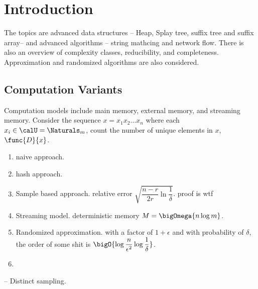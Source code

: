 \chapter{Introduction}
The topics are advanced data structures -- Heap, Splay tree, suffix tree and suffix array-- and advanced algorithms -- string mathcing and network flow. There is also an overview of complexity classes, reducibility, and completeness. Approximation and randomized algorithms are also considered.

\section{Computation Variants}
Computation models include main memory, external memory, and streaming memory. Consider the sequence \(x=x_1x_2\dots x_n\) where each \(x_i \in \calU = \Naturals_m\), count the number of unique elements in \(x\), \(\func{D}{x}\).

\begin{enumerate}
    \item naive approach.
    \item hash approach.
    \item Sample based approach. relative error \(\sqrt{\dfrac{n-r}{2r} \ln \dfrac{1}{\delta}}\). proof is wtf
    \item Streaming model. deterministic memory \(M = \bigOmega{n \log m}\).
    \item Randomized approximation. with a factor of \(1+\epsilon\) and with probability of \(\delta\), the order of some shit is \(\bigO{\log \dfrac{n}{\epsilon^2} \log \dfrac{1}{\delta}}\).
    \item 
\end{enumerate}

-- Distinct sampling.